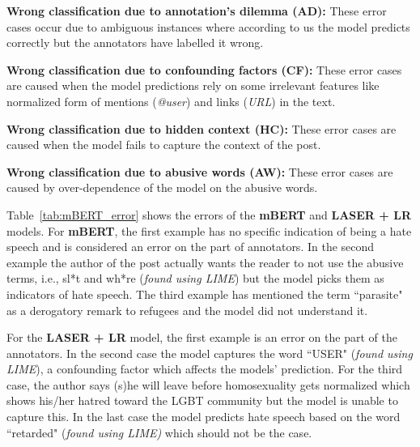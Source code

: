 \documentclass[runningheads]{llncs}
\begin{document}
\begin{compactenum}
    \item \textbf{Wrong classification due to annotation's dilemma (AD):} These error cases occur due to ambiguous instances where according to us the model predicts correctly but the annotators have labelled it wrong.  
    \item \textbf{Wrong classification due to confounding factors (CF):} These error cases are caused when the model predictions rely on some irrelevant features like normalized form of mentions (\textit{@user}) and links (\textit{URL}) in the text.  
    \item \textbf{Wrong classification due to hidden context (HC):} These error cases are caused when the model fails to capture the context of the post.
    \item \textbf{Wrong classification due to abusive words (AW):} These error cases are caused by over-dependence of the model on the abusive words.
\end{compactenum}

Table~\ref{tab:mBERT_error} shows the errors of the \textbf{mBERT} and \textbf{LASER + LR} models. For \textbf{mBERT}, the first example has no specific indication of being a hate speech and is considered an error on the part of annotators. In the second example the author of the post actually wants the reader to not use the abusive terms, i.e., sl*t and wh*re (\textit{found using LIME}) but the model picks them as indicators of hate speech. The third example has mentioned the term ``parasite" as a derogatory remark to refugees and the model did not understand it.

For the \textbf{LASER + LR} model, the first example is an error on the part of the annotators. In the second case the model captures the word ``USER" (\textit{found using LIME}), a confounding factor which affects the models' prediction. For the third case, the author says (s)he will leave before homosexuality gets normalized which shows his/her hatred toward the LGBT community but the model is unable to capture this. In the last case the model predicts hate speech based on the word ``retarded" (\textit{found using LIME)} which should not be the case.
\end{document}
